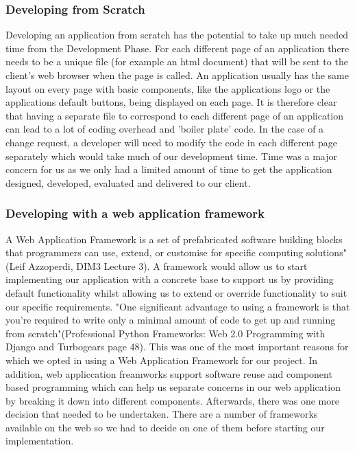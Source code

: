 \documentclass{l3proj}
\begin{document}
\subsubsection{ Developing from Scratch}
Developing an application from scratch has the potential to take up much needed time 
from the Development Phase. For each different page of an application there needs to be 
a unique file (for example an html document) that will be sent to the client's web browser 
when the page is called. An application usually has the same layout on every page with 
basic components, like the applications logo or the applications default buttons, being 
displayed on each page. It is therefore clear that having a separate file to correspond to 
each different page of an application can lead to a lot of coding overhead and 'boiler 
plate' code. In the case of a change request, a developer will need to modify the code in 
each different page separately which would take much of our development time. Time was a major concern for us as we only had a limited amount of time to get the application designed, developed, evaluated and delivered to our client. \subsubsection{Developing with a web application framework}
A Web Application Framework is a set of prefabricated software building blocks that 
programmers can use, extend, or customise for specific computing solutions" (Leif 
Azzoperdi, DIM3 Lecture 3). A framework would allow us to start implementing our 
application with a concrete base to support us by providing default functionality whilst 
allowing us to extend or override functionality to suit our specific requirements. "One 
significant advantage to using a framework is that you're required to write only a 
minimal amount of code to get up and running from scratch"(Professional Python 
Frameworks: Web 2.0 Programming with Django and Turbogears page 48). This was 
one of the most important reasons for which we opted in using a Web Application 
Framework for our project. In addition, web appliccation freamworks support software reuse and component based programming which can help us separate concerns in our web application by breaking it down into different components. Afterwards, there was one more decision that needed to be 
undertaken. There are a number of frameworks available on the web so we had to decide 
on one of them before starting our implementation. 
\end{document}
